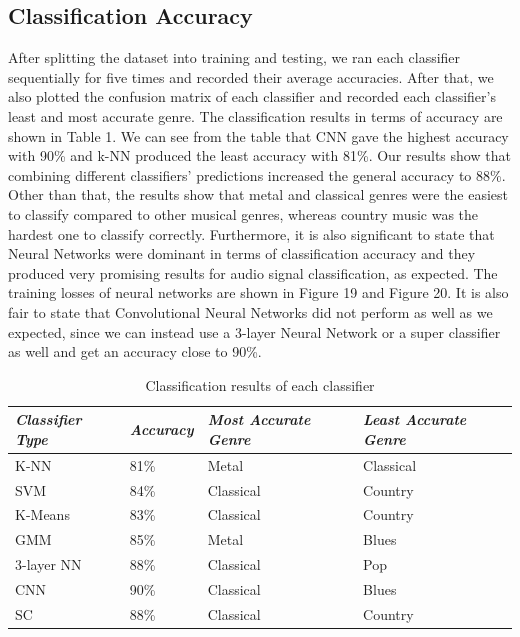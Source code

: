 \subsection{Classification Accuracy}
After splitting the dataset into training and testing, we ran each classifier sequentially for five times and recorded their average accuracies. After that, we also plotted the confusion matrix of each classifier and recorded each classifier's least and most accurate genre. The classification results in terms of accuracy are shown in Table 1. We can see from the table that CNN gave the highest accuracy with 90\% and k-NN produced the least accuracy with 81\%. Our results show that combining different classifiers' predictions increased the general accuracy to 88\%. Other than that, the results show that metal and classical genres were the easiest to classify compared to other musical genres, whereas country music was the hardest one to classify correctly. Furthermore, it is also significant to state that Neural Networks were dominant in terms of classification accuracy and they produced very promising results for audio signal classification, as expected. The training losses of neural networks are shown in Figure 19 and Figure 20. It is also fair to state that Convolutional Neural Networks did not perform as well as we expected, since we can instead use a 3-layer Neural Network or a super classifier as well and get an accuracy close to 90\%. 
\begin{table}
\begin{center}
\caption{Classification results of each classifier} 
\begin{tabular}{ p{1.9cm} p{1.1cm} p{2.8cm} p{2.8cm}}
 \emph{Classifier Type} & \emph{Accuracy}  & \emph{Most Accurate Genre} & \emph{Least Accurate Genre}\\
 \hline
 K-NN & 81\% & Metal & Classical \\
 SVM & 84\% & Classical & Country \\
 K-Means & 83\% & Classical & Country \\
 GMM & 85\% & Metal & Blues \\
 3-layer NN & 88\% & Classical & Pop \\
 CNN & 90\% & Classical & Blues \\
 SC & 88\% & Classical  & Country  \\
\end{tabular}
\end{center}
\end{table}

